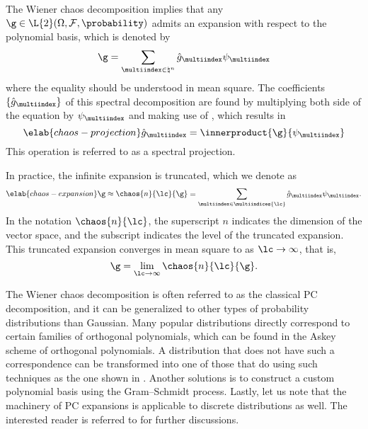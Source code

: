 The Wiener chaos decomposition implies that any $\g \in \L{2}(\Omega,
\mathcal{F}, \probability)$ admits an expansion with respect to the polynomial
basis, which is denoted by
\[
  \g = \sum_{\multiindex \in \natural^n} \hat{g}_{\multiindex} \psi_{\multiindex}
\]
where the equality should be understood in mean square. The coefficients $\{
\hat{g}_{\multiindex} \}$ of this spectral decomposition are found by
multiplying both side of the equation by $\psi_{\multiindex}$ and making use of
, which results in
\begin{equation} \elab{chaos-projection}
  \hat{g}_{\multiindex} = \innerproduct{\g}{\psi_{\multiindex}}
\end{equation}
This operation is referred to as a spectral projection.

In practice, the infinite expansion is truncated, which we denote as
\begin{equation} \elab{chaos-expansion}
  \g \approx \chaos{n}{\lc}{\g} = \sum_{\multiindex \in \multiindices{\lc}} \hat{g}_{\multiindex} \psi_{\multiindex}.
\end{equation}
In the notation $\chaos{n}{\lc}$, the superscript $n$ indicates the dimension of
the vector space, and the subscript \lc indicates the level of the truncated
expansion. This truncated expansion converges in mean square to \g as $\lc \to
\infty$, that is,
\[
  \g = \lim_{\lc \to \infty} \chaos{n}{\lc}{\g}.
\]

The Wiener chaos decomposition is often referred to as the classical \ac{PC}
decomposition, and it can be generalized to other types of probability
distributions than Gaussian. Many popular distributions directly correspond to
certain families of orthogonal polynomials, which can be found in the Askey
scheme of orthogonal polynomials. A distribution that does not have such a
correspondence can be transformed into one of those that do using such
techniques as the one shown in . Another
solutions is to construct a custom polynomial basis using the Gram--Schmidt
process. Lastly, let us note that the machinery of \ac{PC} expansions is
applicable to discrete distributions as well. The interested reader is referred
to \cite{xiu2010} for further discussions.
